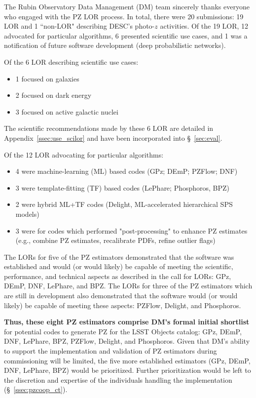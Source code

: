 \documentclass[DM,authoryear,toc]{lsstdoc}
\begin{document}
The Rubin Observatory Data Management (DM) team sincerely thanks everyone who engaged with the PZ LOR process.
In total, there were 20 submissions: 19 LOR and 1 ``non-LOR" describing DESC's photo-$z$ activities. 
Of the 19 LOR, 12 advocated for particular algorithms, 6 presented scientific use cases, and 1 was a notification of future software development (deep probabilistic networks).

Of the 6 LOR describing scientific use cases:
\begin{itemize}
\item1 focused on galaxies
\item2 focused on dark energy
\item3 focused on active galactic nuclei
\end{itemize}
The scientific recommendations made by these 6 LOR are detailed in Appendix~\ref{ssec:use_scilor} and have been incorporated into \S~\ref{sec:eval}.

Of the 12 LOR advocating for particular algorithms:
\begin{itemize}
\item 4 were machine-learning (ML) based codes (GPz; DEmP; PZFlow; DNF)
\item 3 were template-fitting (TF) based codes (LePhare; Phosphoros, BPZ)
\item 2 were hybrid ML+TF codes (Delight, ML-accelerated hierarchical SPS models)
\item 3 were for codes which performed "post-processing" to enhance PZ estimates (e.g., combine PZ estimates, recalibrate PDFs, refine outlier flags)
\end{itemize}

The LORs for five of the PZ estimators demonstrated that the software was established and would (or would likely) be capable of meeting the scientific, performance, and technical aspects as described in the call for LORs: GPz, DEmP, DNF, LePhare, and BPZ.
The LORs for three of the PZ estimators which are still in development also demonstrated that the software would (or would likely) be capable of meeting these aspects: PZFlow, Delight, and Phosphoros. 

\textbf{Thus, these eight PZ estimators comprise DM's formal initial shortlist} for potential codes to generate PZ for the LSST Objects catalog: GPz, DEmP, DNF, LePhare, BPZ, PZFlow, Delight, and Phosphoros.
Given that DM's ability to support the implementation and validation of PZ estimators during commissioning will be limited, the five more established estimators (GPz, DEmP, DNF, LePhare, BPZ) would be prioritized.
Further prioritization would be left to the discretion and expertise of the individuals handling the implementation (\S~\ref{ssec:pzcoop_ct}).
\end{document}
